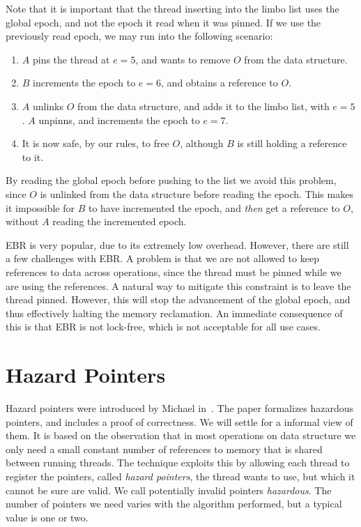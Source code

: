 \documentclass[b5paper]{report}
\begin{document}
Note that it is important that the thread inserting into the limbo list uses the
global epoch, and not the epoch it read when it was pinned. If we use the
previously read epoch, we may run into the following scenario:
\begin{enumerate}
  \item $A$ pins the thread at $e=5$, and wants to remove $O$ from the data structure.
  \item $B$ increments the epoch to $e=6$, and obtains a reference to $O$.
  \item $A$ unlinks $O$ from the data structure, and adds it to the limbo list,
    with $e=5$. $A$ unpinns, and increments the epoch to $e=7$.
  \item It is now safe, by our rules, to free $O$, although $B$ is still holding
    a reference to it.
\end{enumerate}
By reading the global epoch before pushing to the list we avoid this problem,
since $O$ is unlinked from the data structure before reading the epoch. This
makes it impossible for $B$ to have incremented the epoch, and \emph{then} get a
reference to $O$, without $A$ reading the incremented epoch.

EBR is very popular, due to its extremely low overhead.  However, there are
still a few challenges with EBR\@. A problem is that we are not allowed to keep
references to data across operations, since the thread must be pinned while we
are using the references. A natural way to mitigate this constraint is to leave
the thread pinned. However, this will stop the advancement of the global epoch,
and thus effectively halting the memory reclamation. An immediate consequence of
this is that EBR is not lock-free, which is not acceptable for all use cases.

\section{Hazard Pointers\label{sec:hp}}

Hazard pointers were introduced by Michael in~\cite{michael2004hazard}.  The
paper formalizes hazardous pointers, and includes a proof of correctness. We
will settle for a informal view of them. It is based on the observation that in
most operations on data structure we only need a small constant number of
references to memory that is shared between running threads. The technique
exploits this by allowing each thread to register the pointers, called
\emph{hazard pointers}, the thread wants to use, but which it cannot be sure are
valid. We call potentially invalid pointers \emph{hazardous}. The number of
pointers we need varies with the algorithm performed, but a typical value is one
or two.
\end{document}
